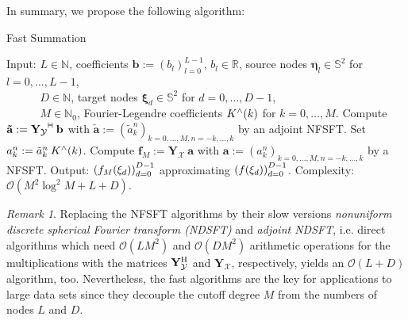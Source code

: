 \documentclass[11pt,a4paper,twoside,bibtotoc]{scrartcl}
\theoremstyle{plain}
\theoremstyle{definition}
\theoremstyle{remark}
\newtheorem{remark}[theorem]{Remark}
\newcommand{\adj}{{\vdash \hspace*{-1.72mm} \dashv}}
\newcommand{\N}{\ensuremath{\mathbb{N}}}
\newcommand{\NZ}{\ensuremath{\mathbb{N}_{0}}}
\newcommand{\R}{\ensuremath{\mathbb{R}}}
\newcommand{\twosphere}{\ensuremath{\mathbb{S}^2}}
\newcommand{\fun}[2]{\ensuremath{#1{\hspace{-0.4ex}}\left(#2\right)}}
\newcommand{\paren}[1]{\ensuremath{\left(#1\right)}}
\newcommand{\mb}[1]{\mathbf{#1}}
\newcommand{\V}[1]{\mb{#1}}
\newcommand{\h}{\text{\rm{H}}}
\def\invisible#1{\textcolor{white}{#1}}
\numberwithin{equation}{section}
\numberwithin{table}{section}
\numberwithin{figure}{section}
\begin{document}
In summary, we propose the following algorithm:
\begin{algorithm}[h]
  \caption{Fast Summation}
  \label{Applications:Algorithm:FastSummation}    
  \begin{algorithmic}
    \STATE Input:             $L \in \N$, coefficients $\V{b}:=\paren{b_{l}}_{l=0}^{L-1}$, 
                              $b_{l} \in \R$, source nodes $\V{\eta}_{l} \in \twosphere$ for $l=0,
                              \ldots,L-1$, \\ 
    \STATE \invisible{Input:} $D \in \N$, target nodes $\V{\xi}_{d} \in \twosphere$ for $d=0,\ldots,D-1$,\\
    \STATE \invisible{Input:} $M \in \NZ$, Fourier-Legendre coefficients $\fun{K^{\wedge}}{k}$ for $k=0,\ldots,M$.  
    \STATE
    \STATE
    \STATE Compute $\V{\tilde{a}} := \V{Y_{\mathcal{Y}}}^{\adj} \: \V{b}$ 
           with $\V{\tilde{a}} := (\tilde{a}_k^n)_{k=0,\ldots,M, n=-k,\ldots,k}$ 
           by an adjoint NFSFT.
        \STATE Set $a_{k}^n := \tilde{a}_{k}^n \: \fun{K^{\wedge}}{k}$.
      \ENDFOR
    \ENDFOR
    \STATE Compute $\V{f}_M := \V{Y_{\mathcal{X}}} \: \V{a}$ with 
           $\V{a} := \paren{a_k^n}_{k=0,\ldots,M, n=-k,\ldots,k}$ 
           by a NFSFT.
    \STATE
    \STATE Output: $\paren{\fun{f_M}{\V{\xi}_{d}}}_{d=0}^{D-1}$ approximating
                    $\paren{\fun{f}{\V{\xi}_{d}}}_{d=0}^{D-1}$.
    \STATE
    \STATE Complexity: $\mathcal{O}\left(M^2 \log^2M + L + D\right)$.  
\end{algorithmic}
\end{algorithm}

\begin{remark}
Replacing the NFSFT algorithms by their slow versions \emph{nonuniform 
discrete spherical Fourier transform (NDSFT)} and \emph{adjoint NDSFT}, i.e. 
direct algorithms which need 
$\mathcal{O}(L M^2)$ and
$\mathcal{O}(D M^2)$ arithmetic operations for the multiplications with the 
matrices $\V{Y}_{\mathcal{Y}}^{\h}$ and $\V{Y}_{\mathcal{X}}$, respectively, 
yields an $\mathcal{O}(L+D)$ algorithm, too. Nevertheless, the fast 
algorithms are the key for applications to large data sets since they 
decouple the cutoff degree $M$ from the numbers of nodes $L$ and $D$.
\end{remark}
\end{document}
